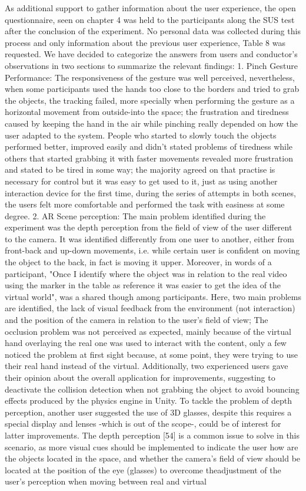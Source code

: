 As additional support to gather information about the user experience, the open questionnaire, seen on chapter 4 was held to the participants along the SUS test after the conclusion of the experiment. No personal data was collected during this process and only information about the previous user experience, Table 8 was requested. We have decided to categorize the answers from users and conductor’s observations in two sections to summarize the relevant findings: 1. Pinch Gesture Performance: The responsiveness of the gesture was well perceived, nevertheless, when some participants used the hands too close to the borders and tried to grab the objects, the tracking failed, more specially when performing the gesture as a horizontal movement from outside-into the space; the frustration and tiredness caused by keeping the hand in the air while pinching really depended on how the user adapted to the system. People who started to slowly touch the objects performed better, improved easily and didn’t stated problems of tiredness while others that started grabbing it with faster movements revealed more frustration and stated to be tired in some way; the majority agreed on that practise is necessary for control but it was easy to get used to it, just as using another interaction device for the first time, during the series of attempts in both scenes, the users felt more comfortable and performed the task with easiness at some degree. 2. AR Scene perception: The main problem identified during the experiment was the depth perception from the field of view of the user different to the camera. It was identified differently from one user to another, either from front-back and up-down movements, i.e. while certain user is confident on moving the object to the back, in fact is moving it upper. Moreover, in words of a participant, "Once I identify where the object was in relation to the real video using the marker in the table as reference it was easier to get the idea of the virtual world", was a shared though among participants. Here, two main problems are identified, the lack of visual feedback from the environment (not interaction) and the position of the camera in relation to the user’s field of view; The occlusion problem was not perceived as expected, mainly because of the virtual hand overlaying the real one was used to interact with the content, only a few noticed the problem at first sight because, at some point, they were trying to use their real hand instead of the virtual. Additionally, two experienced users gave their opinion about the overall application for improvements, suggesting to deactivate the collision detection when not grabbing the object to avoid bouncing effects produced by the physics engine in Unity. To tackle the problem of depth perception, another user suggested the use of 3D glasses, despite this requires a special display and lenses -which is out of the scope-, could be of interest for latter improvements. The depth perception [54] is a common issue to solve in this scenario, as more visual cues should be implemented to indicate the user how are the objects located in the space, and whether the camera’s field of view should be located at the position of the eye (glasses) to overcome theadjustment of the user’s perception when moving between real and virtual 